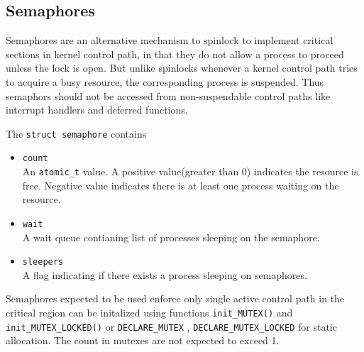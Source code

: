 \documentclass{article}
\begin{document}



\subsection{Semaphores}

Semaphores are an alternative mechanism to spinlock to implement
critical sections in kernel control path, in that they do not allow a
process to proceed unless the lock is open. But unlike spinlocks
whenever a kernel control path tries to acquire a busy resource, the
corresponding process is suspended. Thus semaphors should not be
accessed from non-suspendable control paths like interrupt handlers
and deferred functions.

The \lstinline{struct semaphore} contains

\begin{itemize}  
\item \lstinline{count} \\
  An \lstinline{atomic_t} value. A positive value(greater than 0)
  indicates the resource is free. Negative value indicates there is at
  least one process waiting on the resource.
\item \lstinline{wait} \\
  A wait queue contianing list of processes sleeping on the semaphore.  
\item \lstinline{sleepers} \\
  A flag indicating if there exists a process sleeping on semaphores.    
\end{itemize}
Semaphores expected to be used enforce only single active control path
in the critical region can be initalized using functions
\lstinline{init_MUTEX()} and \lstinline{init_MUTEX_LOCKED()} or
\lstinline{DECLARE_MUTEX} , \lstinline{DECLARE_MUTEX_LOCKED} for
static allocation. The count in mutexes are not expected to exceed 1.
\end{document}
